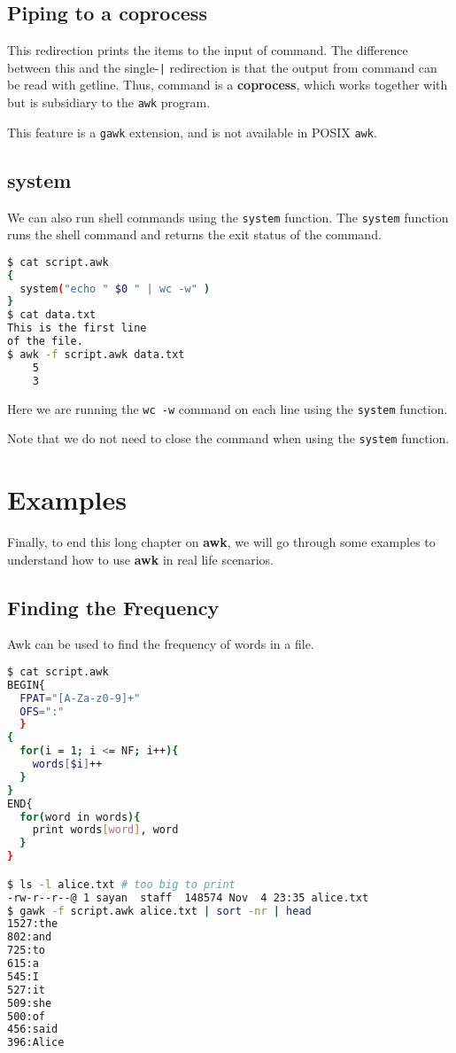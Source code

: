 \subsection{Piping to a coprocess}

This redirection prints the items to the input of command.
The difference between this and the single-\lstinline:|: redirection is that the output from command can be read with getline.
Thus, command is a \textbf{coprocess}, which works together with but is subsidiary to the \lstinline|awk| program.

This feature is a \lstinline|gawk| extension, and is not available in POSIX \lstinline|awk|.


\subsection{system}

We can also run shell commands using the \lstinline|system| function.
The \lstinline|system| function runs the shell command and returns the exit status of the command.

\begin{lstlisting}[language=bash]
$ cat script.awk
{
  system("echo " $0 " | wc -w" )
}
$ cat data.txt
This is the first line
of the file.
$ awk -f script.awk data.txt
    5
    3
\end{lstlisting}

Here we are running the \lstinline|wc -w| command on each line using the \lstinline|system| function.

\begin{remark}
Note that we do not need to close the command when using the \lstinline|system| function.
\end{remark}


\section{Examples}

Finally, to end this long chapter on \textbf{awk}, we will go through some examples to understand how to use \textbf{awk} in real life scenarios.

\subsection{Finding the Frequency}

Awk can be used to find the frequency of words in a file.

\begin{lstlisting}[language=bash]
$ cat script.awk
BEGIN{
  FPAT="[A-Za-z0-9]+"
  OFS=":"
  }
{
  for(i = 1; i <= NF; i++){
    words[$i]++
  }
}
END{
  for(word in words){
    print words[word], word 
  }
}

$ ls -l alice.txt # too big to print
-rw-r--r--@ 1 sayan  staff  148574 Nov  4 23:35 alice.txt
$ gawk -f script.awk alice.txt | sort -nr | head
1527:the
802:and
725:to
615:a
545:I
527:it
509:she
500:of
456:said
396:Alice
\end{lstlisting}

